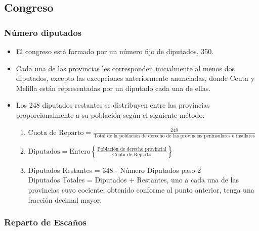 \documentclass[12pt,a4paper,]{book}
\numberwithin{dummy}{section}
\theoremstyle{ocrenumbox}
\theoremstyle{blacknumex}
\theoremstyle{blacknumbox}
\theoremstyle{ocrenum}
\theoremstyle{ocrenum}
\begin{document}
\hypertarget{congreso}{%
\subsection{Congreso}\label{congreso}}

\hypertarget{nuxfamero-diputados}{%
\subsubsection{Número diputados}\label{nuxfamero-diputados}}

\begin{itemize}
\item
  El congreso está formado por un número fijo de diputados, 350.
\item
  Cada una de las provincias les corresponden inicialmente al menos dos
  diputados, excepto las excepciones anteriormente anunciadas, donde
  Ceuta y Melilla están representadas por un diputado cada una de ellas.
\item
  Los 248 diputados restantes se distribuyen entre las provincias
  proporcionalmente a su población según el siguiente método:

  \begin{enumerate}
  \def\labelenumi{\arabic{enumi}.}
  \item
    \(\textrm{Cuota de Reparto} = \frac{248}{\text{Total de la poblaci\'{o}n de derecho de las provincias peninsulares e insulares}}\)
  \item
    \(\textrm{Diputados} = \text{Entero} \left\{\frac{\text{Población de derecho provincial}}{\text{Cuota de Reparto}}\right\}\)
  \item
    Diputados Restantes = 348 - Número Diputados paso 2\\
    Diputados Totales = Diputados + Restantes, uno a cada una de las
    provincias cuyo cociente, obtenido conforme al punto anterior, tenga
    una fracción decimal mayor.
  \end{enumerate}
\end{itemize}

\hypertarget{reparto-de-escauxf1os}{%
\subsubsection{Reparto de Escaños}\label{reparto-de-escauxf1os}}
\end{document}
